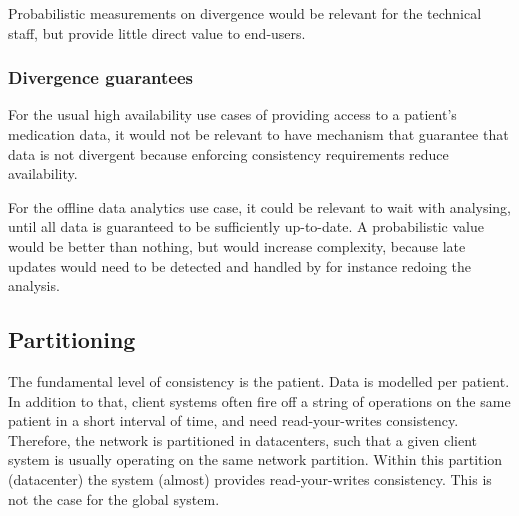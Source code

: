 \documentclass[11pt,a4paper]{report}
\begin{document}
Probabilistic measurements on divergence would be relevant for the technical staff, but provide little direct value to end-users.
\subsubsection{Divergence guarantees}
For the usual high availability use cases of providing access to a patient's medication data, it would not be relevant to have mechanism that guarantee that data is not divergent because enforcing consistency requirements reduce availability.

For the offline data analytics use case, it could be relevant to wait with analysing, until all data is guaranteed to be sufficiently up-to-date. A probabilistic value would be better than nothing, but would increase complexity, because late updates would need to be detected and handled by for instance redoing the analysis.

\subsection{Partitioning}
The fundamental level of consistency is the patient. Data is modelled per patient. 
In addition to that, client systems often fire off a string of operations on the same patient in a short interval of time, and need read-your-writes consistency. Therefore, the network is partitioned in datacenters, such that a given client system is usually operating on the same network partition. Within this partition (datacenter) the system (almost) provides read-your-writes consistency. This is not the case for the global system.
\end{document}
